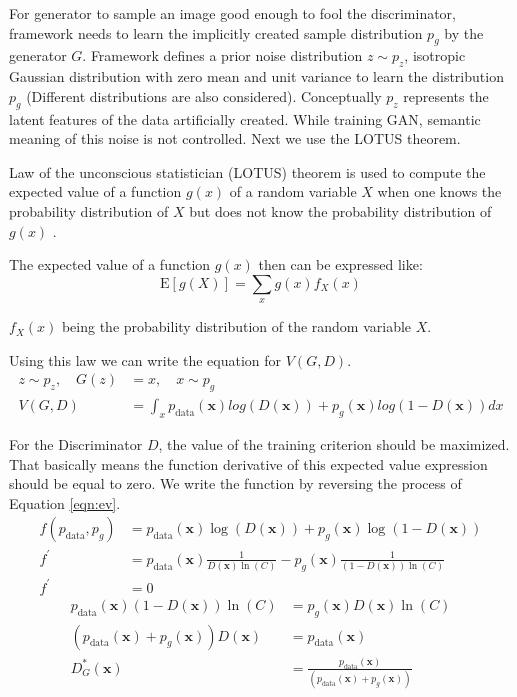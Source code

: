 For generator to sample an image good enough to fool the discriminator, framework needs to learn the
implicitly created sample distribution $p_g$ by the generator $G$. Framework defines a prior noise
distribution $z \sim p_z$, isotropic Gaussian distribution with zero mean and unit variance to learn
the distribution $p_g$ (Different distributions are also considered). Conceptually $p_z$ represents the 
latent features of the data artificially created. While training GAN, semantic meaning of this noise is not controlled.
Next we use the LOTUS theorem.

\begin{theorem}
Law of the unconscious statistician (LOTUS) theorem is used to compute the expected value of a 
function $g(x)$ of a random variable $X$  when one knows the probability distribution of $X$ but 
does not know the probability distribution of $g(x)$ .
\end{theorem}

The expected value of a function $g(x)$ then can be expressed like:
\begin{equation}
    \mathrm{E}[g(X)]=\sum_{x} g(x) f_{X}(x)  
\end{equation}

$f_{X}(x)$ being the probability distribution of the random variable $X$. 

Using this law we can write the equation for $V(G, D)$. 
\begin{align}
    z \sim p_z , \quad G(z) &= x, \quad x \sim p_g\\ 
    V( G, D) &= \int_x p_{\text{data}}(\boldsymbol{x}) log(D(\boldsymbol{x})) + p_g(\boldsymbol{x}) log(1 - D(\boldsymbol{x})) dx
\end{align}

For the Discriminator $D$, the value of the training criterion should be maximized. That basically means the
function derivative of this expected value expression should be equal to zero. We write the
function by reversing the process of Equation \ref{eqn:ev}.
\begin{align}
    f( p_{\text{data}}, p_g) &= p_{\text{data}}(\boldsymbol{x}) \log(D(\boldsymbol{x})) + p_g(\boldsymbol{x}) \log(1 - D(\boldsymbol{x})) \\[5pt]
    f^{\prime} &= p_{\text{data}}(\boldsymbol{x}) \frac{1}{D(\boldsymbol{x}) \ln(C)} - p_g(\boldsymbol{x}) \frac{1}{(1- D(\boldsymbol{x})) \ln(C)} \\[5pt]
    f^{\prime} &= 0
\end{align}
\begin{align}
    p_{\text{data}}(\boldsymbol{x}) (1- D(\boldsymbol{x})) \ln(C) &= p_g(\boldsymbol{x}) D(\boldsymbol{x}) \ln(C)\\[5pt]
    (p_{\text{data}}(\boldsymbol{x}) +  p_g(\boldsymbol{x})) D(\boldsymbol{x}) &= p_{\text{data}}(\boldsymbol{x})\\[5pt]
    D^{*}_G(\boldsymbol{x}) &= \frac{p_{\text{data}}(\boldsymbol{x})}{(p_{\text{data}}(\boldsymbol{x}) +  p_g(\boldsymbol{x}))}\label{eqn:opt_d}
\end{align}

